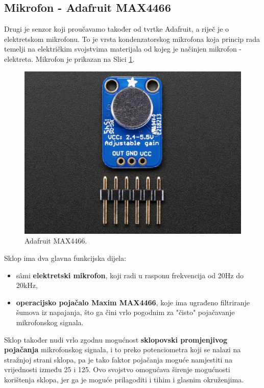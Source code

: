 \documentclass[12pt,a4paper]{article}
\begin{document}
	\newpage
	\subsection{Mikrofon - Adafruit MAX4466}
		Drugi je senzor koji proučavamo također od tvrtke Adafruit, a riječ je o elektretskom mikrofonu. To je vrsta kondenzatorskog mikrofona koja princip rada temelji na električkim svojstvima materijala od kojeg je načinjen mikrofon - elektreta. Mikrofon je prikazan na Slici \ref{fig:max4466}.

		\begin{figure}[h!]
			\includegraphics[width=\linewidth]{slike/4466.jpg}
			\caption{Adafruit MAX4466.}
			\label{fig:max4466}
		\end{figure}

		\par Sklop ima dva glavna funkcijska dijela:
		\begin{itemize}
			\item sâmi \textbf{elektretski mikrofon}, koji radi u rasponu frekvencija od 20Hz do 20kHz,
			\item \textbf{operacijsko pojačalo Maxim MAX4466}, koje ima ugrađeno filtriranje šumova iz napajanja, što ga čini vrlo pogodnim za "čisto" pojačavanje mikrofonskog signala.
		\end{itemize}

		Sklop također nudi vrlo zgodnu mogućnost \textbf{sklopovski promjenjivog pojačanja} mikrofonskog signala, i to preko potenciometra koji se nalazi na stražnjoj strani sklopa, pa je tako faktor pojačanja moguće namjestiti na vrijednosti između 25 i 125. Ovo svojstvo omogućava širenje mogućnosti korištenja sklopa, jer ga je moguće prilagoditi i tihim i glasnim okruženjima.
\end{document}

